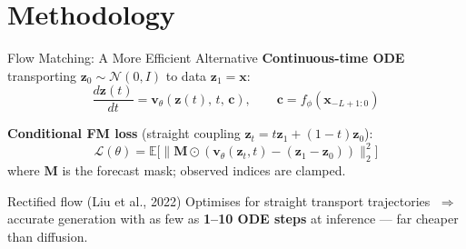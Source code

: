 \documentclass[aspectratio=169,11pt]{beamer}
\begin{document}
\section{Methodology}

\begin{frame}{Flow Matching: A More Efficient Alternative}
  \textbf{Continuous-time ODE} transporting
  $\mathbf{z}_0\!\sim\!\mathcal{N}(0,I)$ to data $\mathbf{z}_1=\mathbf{x}$:
  \[
    \frac{d\mathbf{z}(t)}{dt}
      = \mathbf{v}_\theta(\mathbf{z}(t),\,t,\,\mathbf{c}),
    \qquad
    \mathbf{c} = f_\phi(\mathbf{x}_{-L+1:0})
  \]

  \textbf{Conditional FM loss}
  (straight coupling $\mathbf{z}_t = t\mathbf{z}_1 + (1-t)\mathbf{z}_0$):
  \[
    \mathcal{L}(\theta)
      = \mathbb{E}\bigl[
          \|\mathbf{M}\odot
            (\mathbf{v}_\theta(\mathbf{z}_t,t)
             - (\mathbf{z}_1 - \mathbf{z}_0))\|_2^2
        \bigr]
  \]
  where $\mathbf{M}$ is the forecast mask; observed indices are clamped.

  \vspace{6pt}
  \begin{block}{Rectified flow (Liu et al., 2022)}
    Optimises for straight transport trajectories
    $\;\Rightarrow\;$ accurate generation with as few as
    \textbf{1--10 ODE steps} at inference — far cheaper than diffusion.
  \end{block}
\end{frame}
\end{document}
